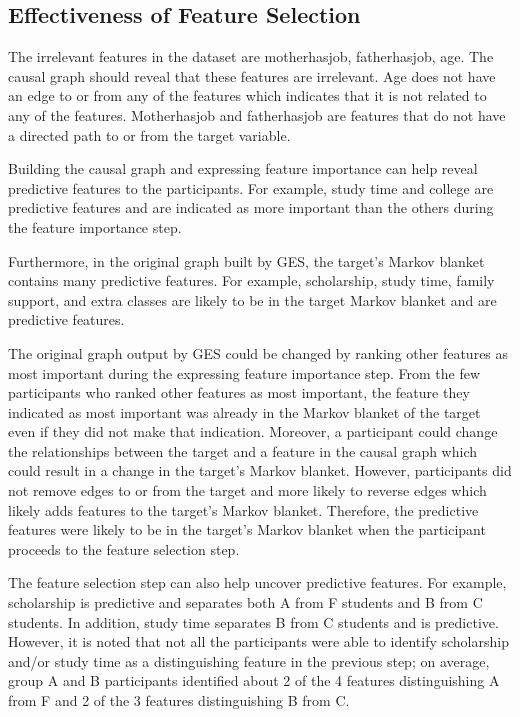 \subsection { Effectiveness of Feature Selection }
The irrelevant features in the dataset are motherhasjob, fatherhasjob, age. The causal graph should reveal that these features are irrelevant. Age does not have an edge to or from any of the features which indicates that it is not related to any of the features. Motherhasjob and fatherhasjob are features that do not have a directed path to or from the target variable.

Building the causal graph and expressing feature importance can help reveal predictive features to the participants. For example, study time and college are predictive features and are indicated as more important than the others during the feature importance step.

Furthermore, in the original graph built by GES, the target's Markov blanket contains many predictive features. For example, scholarship, study time, family support, and extra classes are likely to be in the target Markov blanket and are predictive features.

The original graph output by GES could be changed by ranking other features as most important during the expressing feature importance step. From the few participants who ranked other features as most important, the feature they indicated as most important was already in the Markov blanket of the target even if they did not make that indication. Moreover, a participant could change the relationships between the target and a feature in the causal graph which could result in a change in the target's Markov blanket. However, participants did not remove edges to or from the target and more likely to reverse edges which likely adds features to the target's Markov blanket. Therefore, the predictive features were likely to be in the target's Markov blanket when the participant proceeds to the feature selection step.

The feature selection step can also help uncover predictive features. For example, scholarship is predictive and separates both A from F students and B from C students. In addition, study time separates B from C students and is predictive. However, it is noted that not all the participants were able to identify scholarship and/or study time as a distinguishing feature in the previous step; on average, group A and B participants identified about 2 of the 4 features distinguishing A from F and 2 of the 3 features distinguishing B from C.

